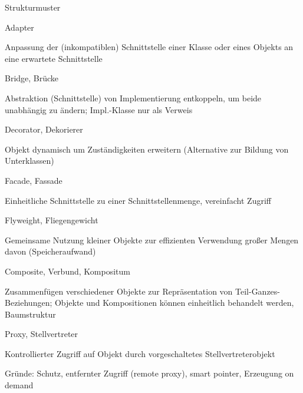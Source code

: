 \documentclass[a4paper]{article}
\begin{document}
\begin{multicols}{3}
  Strukturmuster
  \begin{itemize*}
    \item Adapter
          \begin{itemize*}
            \item Anpassung der (inkompatiblen) Schnittstelle einer Klasse oder eines Objekts an eine erwartete Schnittstelle
          \end{itemize*}
    \item Bridge, Brücke
          \begin{itemize*}
            \item Abstraktion (Schnittstelle) von Implementierung entkoppeln, um beide unabhängig zu ändern; Impl.-Klasse nur als Verweis
          \end{itemize*}
    \item Decorator, Dekorierer
          \begin{itemize*}
            \item Objekt dynamisch um Zuständigkeiten erweitern (Alternative zur Bildung von Unterklassen)
          \end{itemize*}
    \item Facade, Fassade
          \begin{itemize*}
            \item Einheitliche Schnittstelle zu einer Schnittstellenmenge, vereinfacht Zugriff
          \end{itemize*}
    \item Flyweight, Fliegengewicht
          \begin{itemize*}
            \item Gemeinsame Nutzung kleiner Objekte zur effizienten Verwendung großer Mengen davon (Speicheraufwand)
          \end{itemize*}
    \item Composite, Verbund, Kompositum
          \begin{itemize*}
            \item Zusammenfügen verschiedener Objekte zur Repräsentation von Teil-Ganzes-Beziehungen; Objekte und Kompositionen können einheitlich behandelt werden, Baumstruktur
          \end{itemize*}
    \item Proxy, Stellvertreter
          \begin{itemize*}
            \item Kontrollierter Zugriff auf Objekt durch vorgeschaltetes Stellvertreterobjekt
            \item Gründe: Schutz, entfernter Zugriff (remote proxy), smart pointer, Erzeugung on demand
          \end{itemize*}
  \end{itemize*}


\end{multicols}
\end{document}
